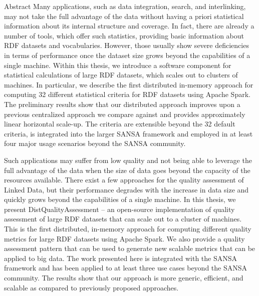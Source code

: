 \large Abstract
Many applications, such as data integration, search, and interlinking, may not take the full advantage of the data without having a priori statistical information about its internal structure and coverage.
In fact, there are already a number of tools, which offer such statistics, providing basic information about RDF datasets and vocabularies.
However, those usually show severe deficiencies in terms of performance once the dataset size grows beyond the capabilities of a single machine.
Within this thesis, we introduce a software component for statistical calculations of large RDF datasets, which scales out to clusters of machines.
In particular, we describe the first distributed in-memory approach for computing 32 different statistical criteria for RDF datasets using Apache Spark.
The preliminary results show that our distributed approach improves upon a previous centralized approach we compare against and provides approximately linear horizontal scale-up. 
The criteria are extensible beyond the 32 default criteria, is integrated into the larger SANSA framework and employed in at least four major usage scenarios beyond the SANSA community.

Such applications may suffer from low quality and not being able to leverage the full advantage of the data when the size of data goes beyond the capacity of the resources available.
There exist a few approaches for the quality assessment of Linked Data, but their performance degrades with the increase in data size and quickly grows beyond the capabilities of a single machine.
In this thesis, we present DistQualityAssessment -- an open-source 
implementation of quality assessment of large RDF datasets that can scale out to a cluster of machines.
This is the first distributed, in-memory approach for computing different quality metrics for large RDF datasets using Apache Spark. We also provide a quality assessment pattern that can be used to generate new scalable metrics that can be applied to big data.
The work presented here is integrated with the SANSA framework and has been applied to at least three use cases beyond the SANSA community.   
The results show that our approach is more generic, efficient, and scalable as compared to previously proposed approaches.

